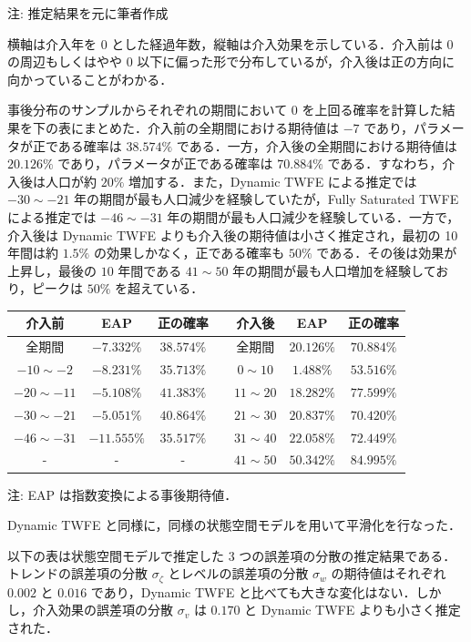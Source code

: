 注: 推定結果を元に筆者作成

横軸は介入年を \(0\)
とした経過年数，縦軸は介入効果を示している．介入前は \(0\)
の周辺もしくはやや \(0\)
以下に偏った形で分布しているが，介入後は正の方向に向かっていることがわかる．

事後分布のサンプルからそれぞれの期間において \(0\)
を上回る確率を計算した結果を下の表にまとめた．介入前の全期間における期待値は
\(-7%
\) であり，パラメータが正である確率は \(38.574\%\)
である．一方，介入後の全期間における期待値は \(20.126\%\)
であり，パラメータが正である確率は \(70.884\%\)
である．すなわち，介入後は人口が約 \(20\%\) 増加する．また，Dynamic TWFE
による推定では \(-30 \sim -21\)
年の期間が最も人口減少を経験していたが，Fully Saturated TWFE
による推定では \(-46 \sim -31\)
年の期間が最も人口減少を経験している．一方で，介入後は Dynamic TWFE
よりも介入後の期待値は小さく推定され，最初の 10 年間は約 \(1.5\%\)
の効果しかなく，正である確率も \(50\%\)
である．その後は効果が上昇し，最後の \(10\) 年間である \(41 \sim 50\)
年の期間が最も人口増加を経験しており，ピークは \(50\%\) を超えている．

\begin{longtable}[]{@{}ccccccc@{}}
\toprule
介入前 & EAP & 正の確率 & & 介入後 & EAP & 正の確率\tabularnewline
\midrule
\endhead
全期間 & \(-7.332\%\) & \(38.574\%\) & & 全期間 & \(20.126\%\) &
\(70.884\%\)\tabularnewline
\(-10 \sim -2\) & \(-8.231\%\) & \(35.713\%\) & & \(0 \sim 10\) &
\(1.488\%\) & \(53.516\%\)\tabularnewline
\(-20 \sim -11\) & \(-5.108\%\) & \(41.383\%\) & & \(11 \sim 20\) &
\(18.282\%\) & \(77.599\%\)\tabularnewline
\(-30 \sim -21\) & \(-5.051\%\) & \(40.864\%\) & & \(21 \sim 30\) &
\(20.837\%\) & \(70.420\%\)\tabularnewline
\(-46 \sim -31\) & \(-11.555\%\) & \(35.517\%\) & & \(31 \sim 40\) &
\(22.058\%\) & \(72.449\%\)\tabularnewline
- & - & - & & \(41 \sim 50\) & \(50.342\%\) &
\(84.995\%\)\tabularnewline
\bottomrule
\end{longtable}

注: EAP は指数変換による事後期待値．

Dynamic TWFE と同様に，同様の状態空間モデルを用いて平滑化を行なった．

以下の表は状態空間モデルで推定した \(3\)
つの誤差項の分散の推定結果である．トレンドの誤差項の分散
\(\sigma_{\zeta}\) とレベルの誤差項の分散 \(\sigma_{w}\)
の期待値はそれぞれ \(0.002\) と \(0.016\) であり，Dynamic TWFE
と比べても大きな変化はない．しかし，介入効果の誤差項の分散
\(\sigma_{v}\) は \(0.170\) と Dynamic TWFE よりも小さく推定された．

